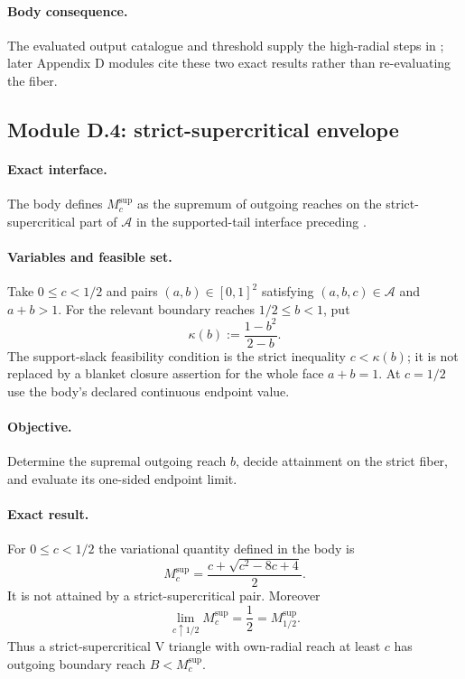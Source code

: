 \paragraph{Body consequence.}
The evaluated output catalogue and threshold supply the high-radial steps in
; later Appendix D
modules cite these two exact results rather than re-evaluating the fiber.

\subsection{Module D.4: strict-supercritical envelope}

\paragraph{Exact interface.}
The body defines $M_c^{\mathrm{sup}}$ as the supremum of outgoing reaches on
the strict-supercritical part of $\mathcal A$ in the supported-tail interface
preceding .

\paragraph{Variables and feasible set.}
Take $0\le c<1/2$ and pairs $(a,b)\in[0,1]^2$ satisfying
$(a,b,c)\in\mathcal A$ and $a+b>1$.  For the relevant boundary reaches
$1/2\le b<1$, put
\[
 \kappa(b):=\frac{1-b^2}{2-b}.
\]
The support-slack feasibility condition is the strict inequality
$c<\kappa(b)$; it is not replaced by a blanket closure assertion for the
whole face $a+b=1$.  At $c=1/2$ use the body's declared continuous endpoint
value.

\paragraph{Objective.}
Determine the supremal outgoing reach $b$, decide attainment on the strict
fiber, and evaluate its one-sided endpoint limit.

\paragraph{Exact result.}

\begin{lemma}
\label{lem:app-supercritical-envelope}
For $0\le c<1/2$ the variational quantity defined in the body is
\[
 M_c^{\mathrm{sup}}=\frac{c+\sqrt{c^2-8c+4}}2.
\]
It is not attained by a strict-supercritical pair.  Moreover
\[
 \lim_{c\uparrow1/2}M_c^{\mathrm{sup}}=\frac12
 =M_{1/2}^{\mathrm{sup}}.
\]
Thus a strict-supercritical V triangle with own-radial reach at least $c$
has outgoing boundary reach $B<M_c^{\mathrm{sup}}$.
\end{lemma}

